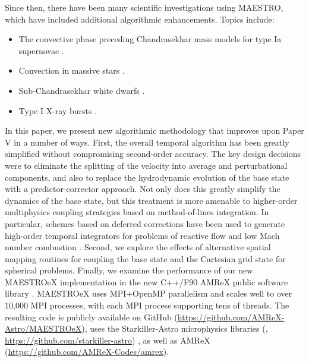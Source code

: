 Since then, there have been many scientific investigations using MAESTRO, which have included additional algorithmic enhancements.  Topics include:
\begin{itemize}
\item The convective phase preceding Chandrasekhar mass models for type Ia supernovae \citep{MAESTRO_convection,MAESTRO_AMR,MAESTRO_CASTRO}.
\item Convection in massive stars \citep{Gilet:2013,gilkis:2016}.
\item Sub-Chandrasekhar white dwarfs \citep{subChandra_I,subChandra_II}.
\item Type I X-ray bursts \citep{XRB_I,XRB_II,XRB_III}.
\end{itemize}

In this paper, we present new algorithmic methodology that improves upon Paper V in a number of ways.
First, the overall temporal algorithm has been greatly simplified without compromising second-order accuracy.
The key design decisions were to eliminate the splitting of the velocity into average and perturbational components,
and also to replace the hydrodynamic evolution of the base state with a predictor-corrector approach.
Not only does this greatly simplify the dynamics of the base
state, but this treatment is more amenable to higher-order multiphysics coupling strategies
based on method-of-lines integration.
In particular, schemes based on deferred corrections \citep{dutt2000spectral} have been used to generate 
high-order temporal integrators for problems of reactive flow and low Mach number combustion \citep{pazner2016high,nonaka2018conservative}.
Second, we explore the effects of alternative spatial mapping routines for coupling the base state and the Cartesian grid state for spherical problems.
Finally, we examine the performance of our new MAESTROeX implementation in the new C++/F90 AMReX public software library \citep{AMReX,AMReX_JOSS}.
MAESTROeX uses MPI+OpenMP parallelism and scales well to over 10,000 MPI processes, with each MPI process supporting tens of threads.
The resulting code is publicly available on GitHub (\url{https://github.com/AMReX-Astro/MAESTROeX}),
uses the Starkiller-Astro microphysics libraries (\citealt{starkiller}, \url{https://github.com/starkiller-astro}) ,
as well as AMReX (\url{https://github.com/AMReX-Codes/amrex}).

